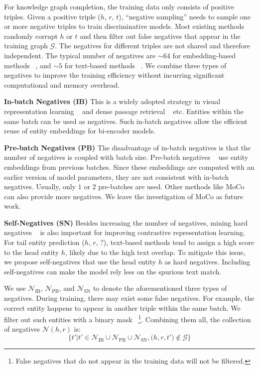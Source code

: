 \documentclass[11pt]{article}
\begin{document}
For knowledge graph completion,
the training data only consists of positive triples.
Given a positive triple ($h$, $r$, $t$),
``negative sampling'' needs to sample one or more negative triples
to train discriminative models.
Most existing methods randomly corrupt $h$ or $t$
and then filter out false negatives that appear in the training graph $\mathcal{G}$.
The negatives for different triples are not shared and therefore independent.
The typical number of negatives are $\sim64$ for embedding-based methods ~\citep{sun2018rotate},
and $\sim5$ for text-based methods ~\citep{wang2021structure}.
We combine three types of negatives
to improve the training efficiency
without incurring significant computational and memory overhead.
\newline

\noindent
\textbf{In-batch Negatives (IB)}
This is a widely adopted strategy in visual representation learning ~\citep{chen2020simple}
and dense passage retrieval ~\citep{karpukhin-etal-2020-dense} etc.
Entities within the same batch can be used as negatives.
Such in-batch negatives allow the efficient reuse of entity embeddings for bi-encoder models.
\newline

\noindent
\textbf{Pre-batch Negatives (PB)}
The disadvantage of in-batch negatives is that
the number of negatives is coupled with batch size.
Pre-batch negatives ~\citep{Lee2021LearningDR}
use entity embeddings from previous batches.
Since these embeddings are computed with an earlier version of model parameters,
they are not consistent with in-batch negatives.
Usually,
only $1$ or $2$ pre-batches are used.
Other methods like MoCo ~\citep{he2020momentum} can also provide more negatives.
We leave the investigation of MoCo as future work.
\newline

\noindent
\textbf{Self-Negatives (SN)}
Besides increasing the number of negatives,
mining hard negatives ~\citep{gao2021simcse,xiong2020approximate} is also important
for improving contrastive representation learning.
For tail entity prediction ($h$, $r$, $?$),
text-based methods
tend to assign a high score to the head entity $h$,
likely due to the high text overlap.
To mitigate this issue,
we propose self-negatives that use the head entity $h$ as hard negatives.
Including self-negatives can make the model rely less
on the spurious text match.
\newline

We use $\mathcal{N}_\text{IB}$, $\mathcal{N}_\text{PB}$, and $\mathcal{N}_\text{SN}$
to denote the aforementioned three types of negatives.
During training,
there may exist some false negatives.
For example,
the correct entity happens to appear in another triple within the same batch.
We filter out such entities with a binary mask
~\footnote{False negatives that do not appear in the training data will not be filtered.}.
Combining them all,
the collection of negatives $\mathcal{N}(h,r)$ is:
\begin{equation}
\{t'| t' \in \mathcal{N}_\text{IB} \cup \mathcal{N}_\text{PB} \cup \mathcal{N}_\text{SN},
\text{(}h,r,t'\text{)} \notin \mathcal{G}\}
\end{equation}
\end{document}
